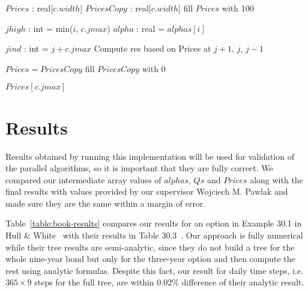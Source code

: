 {
\setlength{\interspacetitleruled}{-.4pt}%
\begin{algorithm}[H]
    \DontPrintSemicolon
    \setcounter{AlgoLine}{42}
    
    \;
    $Prices$ : real[$c.width$]\;
    $PricesCopy$ : real[$c.width$]\;
    fill $Prices$ with 100 
    
     {
        $jhigh$ : int = min($i$, $c.jmax$)\;
        $alpha$ : real = $alphas[i]$\;
        
         {
            $jind$ : int = $j + c.jmax$\;
            Compute res based on Prices at $j+1$, $j$, $j-1$\;
        }
        
        $Prices = PricesCopy$\;
        fill $PricesCopy$ with 0\;
    }

    \KwRet $Prices[c.jmax]$
\end{algorithm}
}

\section{Results}

Results obtained by running this implementation will be used for validation of the parallel algorithms, so it is important that they are fully correct. We compared our intermediate array values of $alphas$, $Qs$ and $Prices$ along with the final results with values provided by our supervisor Wojciech M. Pawlak and made sure they are the same within a margin of error.

Table~\ref{table:book-results} compares our results for an option in Example 30.1 in Hull \& White~\cite[pg. 706]{ofod} with their results in Table 30.3~\cite[pg. 707]{ofod}. Our approach is fully numerical while their tree results are semi-analytic, since they do not build a tree for the whole nine-year bond but only for the three-year option and then compute the rest using analytic formulas. Despite this fact, our result for daily time steps, i.e. $365 \times 9$ steps for the full tree, are within $0.02\%$ difference of their analytic result.

